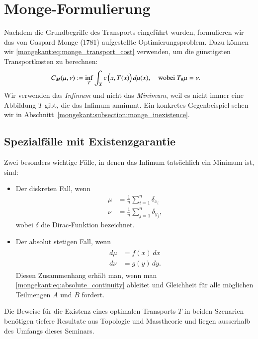 %
%
%
%
\section{Monge-Formulierung%
\label{mongekant:section:teil1}}

Nachdem die Grundbegriffe des Transports eingeführt wurden,
formulieren wir das von Gaspard Monge (1781) aufgestellte Optimierungsproblem.
Dazu können wir \eqref{mongekant:eq:monge_transport_cost} verwenden,
um die günstigsten Transportkosten zu berechnen:
\begin{align}
C_M(\mu, \nu)
&:=
\inf_{T}
\int_X c\,\Bigl(x, T(x)\Bigr)\, d\mu(x)
,\quad
\text{wobei } T_{\#}\mu=\nu
.
\label{mongekant:eq:monge_problem}
\end{align}
Wir verwenden das \emph{Infimum} und nicht das \emph{Minimum},
weil es nicht immer eine Abbildung $T$ gibt,
die das Infimum annimmt.
Ein konkretes Gegenbeispiel sehen wir in
Abschnitt~\ref{mongekant:subsection:monge_inexistence}.

\subsection{Spezialfälle mit Existenzgarantie}
Zwei besonders wichtige Fälle,
in denen das Infimum tatsächlich ein Minimum ist,
sind:
\begin{itemize}
\item Der diskreten Fall, wenn
\begin{align*}
\mu
&=
\frac{1}{n} \sum_{i=1}^n \delta_{x_i}
\\
\nu
&=
\frac{1}{n} \sum_{j=1}^n \delta_{y_j}
,
\end{align*}
wobei $\delta$ die Dirac-Funktion bezeichnet.
\item Der absolut stetigen Fall, wenn
\begin{align}
\begin{aligned}
d\mu
&=
f(x)\, dx
\\
d\nu
&=
g(y)\, dy
.
\end{aligned}
\label{mongekant:eq:absolute_densities}
\end{align}
Diesen Zusammenhang erhält man,
wenn man \eqref{mongekant:eq:absolute_continuity} ableitet und
Gleichheit für alle möglichen Teilmengen $A$ und $B$ fordert.
\end{itemize}
Die Beweise für die Existenz eines optimalen Transports $T$ in beiden Szenarien
benötigen tiefere Resultate aus Topologie und Masstheorie und
liegen ausserhalb des Umfangs dieses Seminars.

